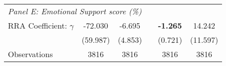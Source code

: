 {\begin{tabular}{l*{5}{c}}
\midrule

 \multicolumn{6}{l}{\textit{Panel E: Emotional Support score (\%)}} \\
RRA Coefficient: $\gamma$&  -72.030         &     -6.695  &           &   \textbf{-1.265\sym{*}}  &     14.242               \\
                & (59.987)         &       (4.853)          & &  (0.721)         &       (11.597)            \\
\addlinespace
Observations    &     3816         &     3816         & &    3816         &     3816         \\
\bottomrule
\end{tabular}
}
